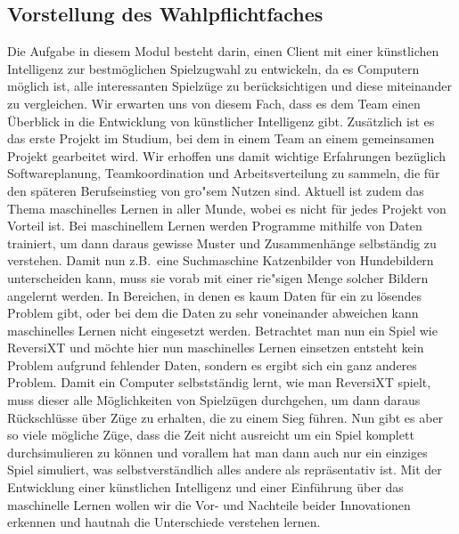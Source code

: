 \subsection{Vorstellung des Wahlpflichtfaches}\label{subsec:vorstellung-des-wahlpflichtfaches}
Die Aufgabe in diesem Modul besteht darin, einen Client mit einer k\"unstlichen Intelligenz zur bestm\"oglichen Spielzugwahl zu entwickeln, da es Computern m\"oglich ist, alle interessanten Spielz\"uge zu ber\"ucksichtigen und diese miteinander zu vergleichen.
Wir erwarten uns von diesem Fach, dass es dem Team einen \"Uberblick in die Entwicklung von k\"unstlicher Intelligenz gibt.
Zus\"atzlich ist es das erste Projekt im Studium, bei dem in einem Team an einem gemeinsamen Projekt gearbeitet wird.
Wir erhoffen uns damit wichtige Erfahrungen bez\"uglich Softwareplanung, Teamkoordination und Arbeitsverteilung zu sammeln, die f\"ur den sp\"ateren Berufseinstieg von gro"sem Nutzen sind.
Aktuell ist zudem das Thema maschinelles Lernen in aller Munde, wobei es nicht f\"ur jedes Projekt von Vorteil ist.
Bei maschinellem Lernen werden Programme mithilfe von Daten trainiert, um dann daraus gewisse Muster und Zusammenh\"ange selbst\"andig zu verstehen.
Damit nun z.B.\ eine Suchmaschine Katzenbilder von Hundebildern unterscheiden kann, muss sie vorab mit einer rie"sigen Menge solcher Bildern angelernt werden.
In Bereichen, in denen es kaum Daten f\"ur ein zu l\"osendes Problem gibt, oder bei dem die Daten zu sehr voneinander abweichen kann maschinelles Lernen nicht eingesetzt werden.
Betrachtet man nun ein Spiel wie ReversiXT und m\"ochte hier nun maschinelles Lernen einsetzen entsteht kein Problem aufgrund fehlender Daten, sondern es ergibt sich ein ganz anderes Problem.
Damit ein Computer selbstst\"andig lernt, wie man ReversiXT spielt, muss dieser alle M\"oglichkeiten von Spielz\"ugen durchgehen, um dann daraus R\"uckschl\"usse \"uber Z\"uge zu erhalten, die zu einem Sieg f\"uhren.
Nun gibt es aber so viele m\"ogliche Z\"uge, dass die Zeit nicht ausreicht um ein Spiel komplett durchsimulieren zu k\"onnen und vorallem hat man dann auch nur ein einziges Spiel simuliert, was selbstverst\"andlich alles andere als repr\"asentativ ist.
Mit der Entwicklung einer k\"unstlichen Intelligenz und einer Einf\"uhrung \"uber das maschinelle Lernen wollen wir die Vor- und Nachteile beider Innovationen erkennen und hautnah die Unterschiede verstehen lernen.


\bigskip
\newpage